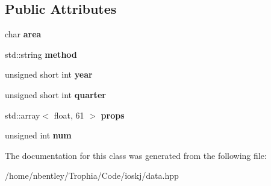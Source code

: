 \subsection*{Public Attributes}
\begin{DoxyCompactItemize}
\item 
\hypertarget{classIOSKJ_1_1Data_1_1SizeFrequency_a08b0a6bd3c85e65f42521048e6e3bab3}{char {\bfseries area}}\label{classIOSKJ_1_1Data_1_1SizeFrequency_a08b0a6bd3c85e65f42521048e6e3bab3}

\item 
\hypertarget{classIOSKJ_1_1Data_1_1SizeFrequency_a49c0a08a3422004645d2226265c237c7}{std\-::string {\bfseries method}}\label{classIOSKJ_1_1Data_1_1SizeFrequency_a49c0a08a3422004645d2226265c237c7}

\item 
\hypertarget{classIOSKJ_1_1Data_1_1SizeFrequency_a19ef92240e288f489c5d90b1c4df0000}{unsigned short int {\bfseries year}}\label{classIOSKJ_1_1Data_1_1SizeFrequency_a19ef92240e288f489c5d90b1c4df0000}

\item 
\hypertarget{classIOSKJ_1_1Data_1_1SizeFrequency_aee8e747384c06491bebb7cc539bbb15a}{unsigned short int {\bfseries quarter}}\label{classIOSKJ_1_1Data_1_1SizeFrequency_aee8e747384c06491bebb7cc539bbb15a}

\item 
\hypertarget{classIOSKJ_1_1Data_1_1SizeFrequency_ab9833e7a7783b8b73489ac83ad0d4bd8}{std\-::array$<$ float, 61 $>$ {\bfseries props}}\label{classIOSKJ_1_1Data_1_1SizeFrequency_ab9833e7a7783b8b73489ac83ad0d4bd8}

\item 
\hypertarget{classIOSKJ_1_1Data_1_1SizeFrequency_ad494b63b6b89bdedae41e62ce4dbc1d7}{unsigned int {\bfseries num}}\label{classIOSKJ_1_1Data_1_1SizeFrequency_ad494b63b6b89bdedae41e62ce4dbc1d7}

\end{DoxyCompactItemize}


The documentation for this class was generated from the following file\-:\begin{DoxyCompactItemize}
\item 
/home/nbentley/\-Trophia/\-Code/ioskj/data.\-hpp\end{DoxyCompactItemize}
